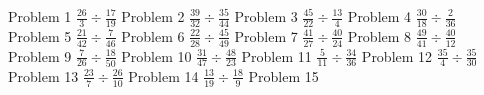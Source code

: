 \documentclass{article}
\begin{document}
Problem 1
\newline
\hfill \break
$\displaystyle \frac{26}{3} \div \frac{17}{19}$
\newline
\hfill \break
Problem 2
\newline
\hfill \break
$\displaystyle \frac{39}{32} \div \frac{35}{44}$
\newline
\hfill \break
Problem 3
\newline
\hfill \break
$\displaystyle \frac{45}{22} \div \frac{13}{4}$
\newline
\hfill \break
Problem 4
\newline
\hfill \break
$\displaystyle \frac{30}{18} \div \frac{2}{36}$
\newline
\hfill \break
Problem 5
\newline
\hfill \break
$\displaystyle \frac{21}{42} \div \frac{7}{46}$
\newline
\hfill \break
Problem 6
\newline
\hfill \break
$\displaystyle \frac{22}{28} \div \frac{45}{49}$
\newline
\hfill \break
Problem 7
\newline
\hfill \break
$\displaystyle \frac{41}{27} \div \frac{40}{24}$
\newline
\hfill \break
Problem 8
\newline
\hfill \break
$\displaystyle \frac{49}{41} \div \frac{40}{12}$
\newline
\hfill \break
Problem 9
\newline
\hfill \break
$\displaystyle \frac{7}{26} \div \frac{18}{50}$
\newline
\hfill \break
Problem 10
\newline
\hfill \break
$\displaystyle \frac{31}{47} \div \frac{48}{23}$
\newline
\hfill \break
Problem 11
\newline
\hfill \break
$\displaystyle \frac{5}{11} \div \frac{34}{36}$
\newline
\hfill \break
Problem 12
\newline
\hfill \break
$\displaystyle \frac{35}{4} \div \frac{35}{30}$
\newline
\hfill \break
Problem 13
\newline
\hfill \break
$\displaystyle \frac{23}{7} \div \frac{26}{10}$
\newline
\hfill \break
Problem 14
\newline
\hfill \break
$\displaystyle \frac{13}{19} \div \frac{18}{9}$
\newline
\hfill \break
Problem 15
\newline
\end{document}
